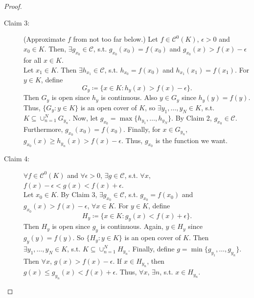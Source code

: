 \documentclass[12pt]{article}
\theoremstyle{plain}
\theoremstyle{definition}
\begin{document}
\begin{proof}
\begin{description}
        \item[Claim 3:] (Approximate $f$ from not too far below.)
        Let $f\in\mathcal{C}^0(K)$, $\epsilon>0$ and $x_0\in K$.
        Then, $\exists g_{x_0}\in\mathcal{C}$, s.t. $g_{x_0}(x_0)=f(x_0)$ and
        $g_{x_0}(x)>f(x)-\epsilon$ for all $x\in K$.\\
        Let $x_1\in K$. Then $\exists h_{x_1}\in\mathcal{C}$, s.t.
        $h_{x_0}=f(x_0)$ and $h_{x_1}(x_1)=f(x_1)$.
        For $y\in K$, define
        $$G_y\coloneqq \{x\in K:h_y(x)>f(x)-\epsilon\}.$$
        Then $G_y$ is open since $h_y$ is continuous.
        Also $y\in G_y$ since $h_y(y)=f(y)$.
        Thus, $\{G_y:y\in K\}$ is an open cover of $K$, so $\exists
        y_1,\ldots,y_N\in K$, s.t. $K\subseteq\cup_{n=1}^N G_{y_n}$.
        Now, let $g_{x_0}=\max\{h_{y_1},\ldots,h_{y_N}\}$.
        By Claim 2, $g_{x_0}\in\mathcal{C}$.
        Furthermore, $g_{x_0}(x_0)=f(x_0)$.
        Finally, for $x\in G_{y_n}$, $g_{x_0}(x)\geq h_{y_n}(x)>f(x)-\epsilon$.
        Thus, $g_{x_0}$ is the function we want.

        \item[Claim 4:] $\forall f\in\mathcal{C}^0(K)$ and $\forall \epsilon>0$,
        $\exists g\in\mathcal{C}$, s.t. $\forall x$,
        $f(x)-\epsilon<g(x)<f(x)+\epsilon$.\\
        Let $x_0\in K$.
        By Claim 3, $\exists g_{x_0}\in\mathcal{C}$, s.t. $g_{x_0}=f(x_0)$ and
        $g_{x_0}(x)>f(x)-\epsilon$, $\forall x\in K$.
        For $y\in K$, define
        $$H_y\coloneqq \{x\in K: g_y(x)<f(x)+\epsilon\}.$$
        Then $H_y$ is open since $g_y$ is continuous.
        Again, $y\in H_y$ since $g_y(y)=f(y)$.
        So $\{H_y:y\in K\}$ is an open cover of $K$.
        Then $\exists y_1,\ldots,y_N\in K$, s.t.
        $K\subseteq\cup_{n=1}^N H_{y_n}$.
        Finally, define
        $g=\min\{g_{y_1},\ldots,g_{y_n}\}$.
        Then $\forall x$, $g(x)>f(x)-\epsilon$.
        If $x\in H_{y_n}$, then $g(x)\leq g_{y_n}(x)<f(x)+\epsilon$.
        Thus, $\forall x$, $\exists n$, s.t. $x\in H_{y_n}$.
    \end{description}
\end{proof}
\end{document}
